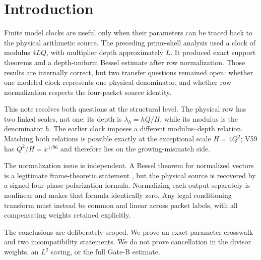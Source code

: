\section{Introduction}

Finite model clocks are useful only when their parameters can be traced back to the
physical arithmetic source.  The preceding prime-shell analysis used a clock of
modulus $4LQ$, with multiplier depth approximately $L$.  It produced exact support
theorems and a depth-uniform Bessel estimate after row normalization.  Those results
are internally correct, but two transfer questions remained open: whether one modeled
clock represents one physical denominator, and whether row normalization respects the
four-packet source identity.

This note resolves both questions at the structural level.  The physical row has two
linked scales, not one: its depth is $\lambda_h=hQ/H$, while its modulus is the
denominator $h$.  The earlier clock imposes a different modulus--depth relation.
Matching both relations is possible exactly at the exceptional scale $H=4Q^2$; V59
has $Q^2/H=x^{1/96}$ and therefore lies on the growing-mismatch side.

The normalization issue is independent.  A Bessel theorem for normalized vectors is
a legitimate frame-theoretic statement \citep{christensen2016}, but the physical
source is recovered by a signed four-phase polarization formula.  Normalizing each
output separately is nonlinear and makes that formula identically zero.  Any legal
conditioning transform must instead be common and linear across packet labels, with
all compensating weights retained explicitly.

The conclusions are deliberately scoped.  We prove an exact parameter crosswalk and
two incompatibility statements.  We do not prove cancellation in the divisor weights,
an $L^2$ saving, or the full Gate-B estimate.
